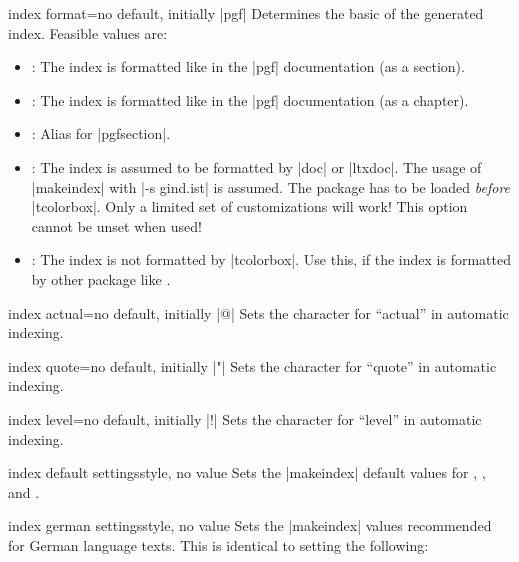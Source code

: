 \begin{docTcbKey}{index format}{=}{no default, initially |pgf|}
  Determines the basic  of the generated index.
  Feasible values are:
  \begin{itemize}
  \item{}: The index is formatted like in the |pgf| documentation (as a section).
  \item{}: The index is formatted like in the |pgf| documentation (as a chapter).
  \item{}: Alias for |pgfsection|.
  \item{}: The index is assumed to be formatted by |doc| or |ltxdoc|. The usage of |makeindex|
    with |-s gind.ist| is assumed. The package  has to be loaded
    \emph{before} |tcolorbox|. Only a limited set of customizations will
    work! This option cannot be unset when used!
  \item{}: The index is not formatted by |tcolorbox|. Use this, if
    the index is formatted by other package like .
  \end{itemize}
\end{docTcbKey}


\begin{docTcbKey}{index actual}{=}{no default, initially |@|}
  Sets the character for \enquote{actual} in automatic indexing.
\end{docTcbKey}

\begin{docTcbKey}{index quote}{=}{no default, initially |"|}
  Sets the character for \enquote{quote} in automatic indexing.
\end{docTcbKey}

\begin{docTcbKey}{index level}{=}{no default, initially |!|}
  Sets the character for \enquote{level} in automatic indexing.
\end{docTcbKey}

\begin{docTcbKey}{index default settings}{}{style, no value}
  Sets the |makeindex| default values for
  ,
  , and
  .
\end{docTcbKey}


\begin{docTcbKey}{index german settings}{}{style, no value}
  Sets the |makeindex| values recommended for German language texts.
  This is identical to setting the following:
\begin{dispListing}
\end{dispListing}
\end{docTcbKey}


